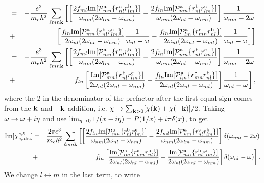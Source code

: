 \documentclass[floatfix,prb,aps,superscriptaddress,11pt,preprint]{revtex4}
\begin{document}
\begin{eqnarray}
&=&
-\frac{e^3}{m_e\hbar^2} 
\sum_{\ell m n\mathbf{k}}
\left[
\left[
\frac{2 f_{ml}\mathrm{Im}[{\cal P}^{\mathrm{a}}_{mn}\{r^{\mathrm{c}}_{nl}r^{\mathrm{b}}_{lm}\}]}
{\omega_{nm}(2\omega_{lm}-\omega_{nm})}
-\frac{2 f_{ln}\mathrm{Im}[{\cal P}^{\mathrm{a}}_{mn}\{r^{\mathrm{b}}_{nl}r^{\mathrm{c}}_{lm}\}]
}{\omega_{nm}(2\omega_{nl}-\omega_{nm})}
\right]
\frac{1}{\omega_{nm}-2\omega}
\right.
\nonumber\\
&+&
\left.
\left[
\frac{f_{ln}\mathrm{Im}[{\cal P}^{\mathrm{a}}_{mn}\{r^{\mathrm{b}}_{nl}r^{\mathrm{c}}_{lm}\}]}
{2\omega_{nl}(2\omega_{nl}-\omega_{nm})}\frac{1}{\omega_{nl}-\omega}
-\frac{f_{ln}\mathrm{Im}[{\cal P}^{\mathrm{a}}_{lm}\{r^{\mathrm{c}}_{mn}r^{\mathrm{b}}_{nl}\}]}
{2\omega_{nl}(2\omega_{nl}-\omega_{ml})}\frac{1}{\omega_{nl}-\omega}
\right]
\right]
\nonumber\\
&=&
-\frac{e^3}{m_e\hbar^2} 
\sum_{\ell m n\mathbf{k}}
\left[
\left[
\frac{2 f_{ml}\mathrm{Im}[{\cal P}^{\mathrm{a}}_{mn}\{r^{\mathrm{c}}_{nl}r^{\mathrm{b}}_{lm}\}]}
{\omega_{nm}(2\omega_{lm}-\omega_{nm})}
-\frac{2 f_{ln}\mathrm{Im}[{\cal P}^{\mathrm{a}}_{mn}\{r^{\mathrm{b}}_{nl}r^{\mathrm{c}}_{lm}\}]
}{\omega_{nm}(2\omega_{nl}-\omega_{nm})}
\right]
\frac{1}{\omega_{nm}-2\omega}
\right.
\nonumber\\
&+&
\left. 
f_{ln}
\left[
\frac{\mathrm{Im}[{\cal P}^{\mathrm{a}}_{mn}\{r^{\mathrm{b}}_{nl}r^{\mathrm{c}}_{lm}\}]}
{2\omega_{nl}(2\omega_{nl}-\omega_{nm})}
-\frac{f_{ln}\mathrm{Im}[{\cal P}^{\mathrm{a}}_{lm}\{r^{\mathrm{c}}_{mn}r^{\mathrm{b}}_{nl}\}]}
{2\omega_{nl}(2\omega_{nl}-\omega_{ml})}
\right]\frac{1}{\omega_{nl}-\omega}
\right]
,
\end{eqnarray}  
where the 2 in the denominator of the prefactor after the first equal
sign comes from the $\mathbf{k}$ and $-\mathbf{k}$ addition, i.e. 
$\chi\to\sum_{\mathbf{k}>0}[\chi(\mathbf{k})+\chi(-\mathbf{k})]/2$. 
Taking $\omega\to\omega +i\eta$ and use
$\lim_{\eta\to 0}1/(x-i\eta)=P(1/x)+i\pi\delta(x)$, to get
\begin{eqnarray}\label{imchie}
\mathrm{Im}[\chi_{e,\mathrm{a}\mathrm{b}\mathrm{c}}^{s,\ell}]
&=&
\frac{2\pi e^3}{m_e\hbar^2} 
\sum_{\ell m n\mathbf{k}}
\left[
\left[
\frac{2 f_{ln}\mathrm{Im}[{\cal P}^{\mathrm{a}}_{mn}\{r^{\mathrm{b}}_{nl}r^{\mathrm{c}}_{lm}\}]
}{\omega_{nm}(2\omega_{nl}-\omega_{nm})}
-\frac{2 f_{ml}\mathrm{Im}[{\cal P}^{\mathrm{a}}_{mn}\{r^{\mathrm{c}}_{nl}r^{\mathrm{b}}_{lm}\}]}
{\omega_{nm}(2\omega_{lm}-\omega_{nm})}
\right]
\delta(\omega_{nm}-2\omega)
\right.
\nonumber\\
&+&
\left. 
f_{ln}
\left[
\frac{\mathrm{Im}[{\cal P}^{\mathrm{a}}_{lm}\{r^{\mathrm{c}}_{mn}r^{\mathrm{b}}_{nl}\}]}
{2\omega_{nl}(2\omega_{nl}-\omega_{ml})}
-
\frac{\mathrm{Im}[{\cal P}^{\mathrm{a}}_{mn}\{r^{\mathrm{b}}_{nl}r^{\mathrm{c}}_{lm}\}]}
{2\omega_{nl}(2\omega_{nl}-\omega_{nm})}
\right]
\delta(\omega_{nl}-\omega)
\right]
.
\end{eqnarray}  
We change $l\leftrightarrow m$ in the last term,
to write
\end{document}

